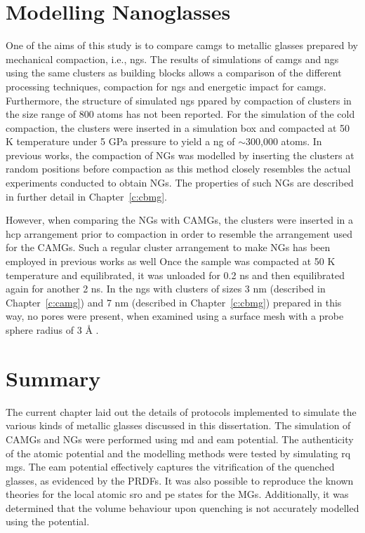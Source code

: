 %
\section{Modelling Nanoglasses}
\begin{changebar}
One of the aims of this study is to compare \gls{camg}s to metallic glasses prepared by mechanical compaction, i.e., \gls{ng}s. The results of simulations of \gls{camg}s and \gls{ng}s using the same clusters as building blocks allows a comparison of the different processing techniques, compaction for \gls{ng}s and energetic impact for \gls{camg}s. Furthermore, the structure of simulated \gls{ng}s ppared by compaction of clusters in the size range of 800 atoms has not been reported. For the simulation of the cold compaction, the clusters were inserted in a simulation box and compacted at 50 K temperature under 5 GPa pressure to yield a \gls{ng} of $\sim$300,000 atoms. In previous works, the compaction of NGs was modelled by inserting the clusters at random positions before compaction  \cite{Adjaoud2018,Kalcher2017} as this method closely resembles the actual experiments conducted to obtain NGs. The properties of such NGs are described in further detail in Chapter~\ref{c:cbmg}. \par

However, when comparing the NGs with CAMGs, the clusters were inserted in a \gls{hcp} arrangement prior to compaction in order to resemble the arrangement used for the CAMGs. Such a regular cluster arrangement to make NGs has been employed in previous works as well \cite{Sopu2009,Cheng2019,Cheng2019a,Zheng2021} Once the sample was compacted at 50 K temperature and equilibrated, it was unloaded for 0.2 ns and then equilibrated again for another 2 ns. In the \gls{ng}s with clusters of sizes 3 nm (described in Chapter~\ref{c:camg}) and 7 nm (described in Chapter~\ref{c:cbmg}) prepared in this way, no pores were present, when examined using a surface mesh with a probe sphere radius of 3 \r{A} \cite{Stukowski2010a,Stukowski2014}. \par
\end{changebar}

\clearpage

\section{Summary}
The current chapter laid out the details of protocols implemented to simulate the various kinds of metallic glasses discussed in this dissertation. The simulation of CAMGs and NGs were performed using \gls{md} and \gls{eam} potential. The authenticity of the atomic potential and the modelling methods were tested by simulating \gls{rq} \gls{mg}s. The \gls{eam} potential effectively captures the vitrification of the quenched glasses, as evidenced by the PRDFs. It was also possible to reproduce the known theories for the local atomic \gls{sro} and \gls{pe} states for the MGs. Additionally, it was determined that the volume behaviour upon quenching is not accurately modelled using the potential. \par

